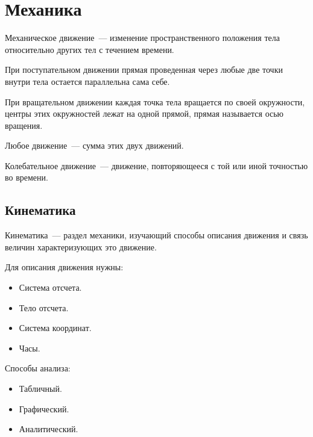 \documentclass[12pt]{article}
\begin{document}
	\tableofcontents
	\setcounter{tocdepth}{3}
	\newpage
	\section{Механика}
	\begin{definition}
		Механическое движение~--- изменение пространственного положения тела относительно других тел с течением времени.
	\end{definition}
	\begin{definition}
		При поступательном движении прямая проведенная через любые две точки внутри тела остается параллельна сама себе.
	\end{definition}
	\begin{definition}
		При вращательном движении каждая точка тела вращается по своей окружности, центры этих окружностей лежат на одной прямой, прямая называется осью вращения.
	\end{definition}
	\begin{statement}
		Любое движение~--- сумма этих двух движений.
	\end{statement}
	\begin{definition}
		Колебательное движение~--- движение, повторяющееся с той или иной точностью во времени.
	\end{definition}
	\subsection{Кинематика}
	\begin{definition}
		Кинематика~--- раздел механики, изучающий способы описания движения и связь величин характеризующих это движение.
	\end{definition}
	\begin{statement}
		Для описания движения нужны:
		\begin{itemize}
			\item Система отсчета.
			\item Тело отсчета.
			\item Система координат.
			\item Часы.
		\end{itemize}
	\end{statement}
	\begin{statement}
		Способы анализа:
		\begin{itemize}
			\item Табличный.
			\item Графический.
			\item Аналитический.
		\end{itemize}
	\end{statement}
\end{document}
